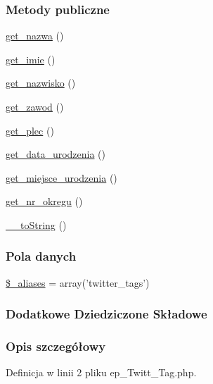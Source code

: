 \subsubsection*{Metody publiczne}
\begin{DoxyCompactItemize}
\item 
\hyperlink{classep___twitt___tag_ac0818f0049d7b84f08f77128f54cee36}{get\-\_\-nazwa} ()
\item 
\hyperlink{classep___twitt___tag_ac4b0c85dc2a130038f2d118dbd0c3d77}{get\-\_\-imie} ()
\item 
\hyperlink{classep___twitt___tag_abdd1d7ff92508da7f748ba1feec97af0}{get\-\_\-nazwisko} ()
\item 
\hyperlink{classep___twitt___tag_af80ca8310b60004454dd02a387deaa2c}{get\-\_\-zawod} ()
\item 
\hyperlink{classep___twitt___tag_ac7f9af5c3fa024e4c26a7b6bd4ce4bb4}{get\-\_\-plec} ()
\item 
\hyperlink{classep___twitt___tag_a880b240cd2d8c336fd1709bf0cb1ae2c}{get\-\_\-data\-\_\-urodzenia} ()
\item 
\hyperlink{classep___twitt___tag_ac57c08ec5e394a19c5bd9280c8376182}{get\-\_\-miejsce\-\_\-urodzenia} ()
\item 
\hyperlink{classep___twitt___tag_a2645a9f0aa5b0ccc482943348c033d0a}{get\-\_\-nr\-\_\-okregu} ()
\item 
\hyperlink{classep___twitt___tag_a7516ca30af0db3cdbf9a7739b48ce91d}{\-\_\-\-\_\-to\-String} ()
\end{DoxyCompactItemize}
\subsubsection*{Pola danych}
\begin{DoxyCompactItemize}
\item 
\hyperlink{classep___twitt___tag_ab4e31d75f0bc5d512456911e5d01366b}{\$\-\_\-aliases} = array('twitter\-\_\-tags')
\end{DoxyCompactItemize}
\subsubsection*{Dodatkowe Dziedziczone Składowe}


\subsubsection{Opis szczegółowy}


Definicja w linii 2 pliku ep\-\_\-\-Twitt\-\_\-\-Tag.\-php.



